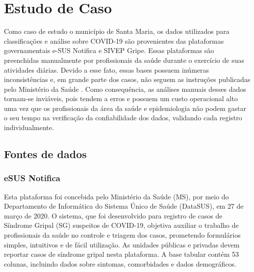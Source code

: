 \chapter{Estudo de Caso} \label{sec_estudo_de_caso}

Como caso de estudo o município de Santa Maria, os dados utilizados para classificações e análise sobre COVID-19 são provenientes das plataformas governamentais e-SUS Notifica e SIVEP Gripe. 
Essas plataformas são preenchidas manualmente por profissionais da saúde durante o exercício de suas atividades diárias. 
Devido a esse fato, essas bases possuem inúmeras inconsistências e, em grande parte dos casos, não seguem as instruções publicadas pelo Ministério da Saúde \cite{instrutivoesus,instrutivosivep}. 
Como consequência, as análises manuais desses dados tornam-se inviáveis, pois tendem a erros e possuem um custo operacional alto uma vez que os profissionais da área da saúde e epidemiologia não podem gastar o seu tempo na verificação da confiabilidade dos dados, validando cada registro individualmente.
    
\section{Fontes de dados}
   
\subsection*{eSUS Notifica}

Esta plataforma foi concebida pelo Ministério da Saúde (MS), por meio do Departamento de Informática do Sistema Único de Saúde (DataSUS), em 27 de março de 2020. O sistema, que foi desenvolvido para registro de casos de Síndrome Gripal (SG) suspeitos de COVID-19, objetiva auxiliar o trabalho de profissionais da saúde no controle e triagem dos casos, prometendo formulários simples, intuitivos e de fácil utilização. As unidades públicas e privadas devem reportar casos de síndrome gripal nesta plataforma. 
A base tabular contém 53 colunas, incluindo dados sobre sintomas, comorbidades e dados demográficos.

